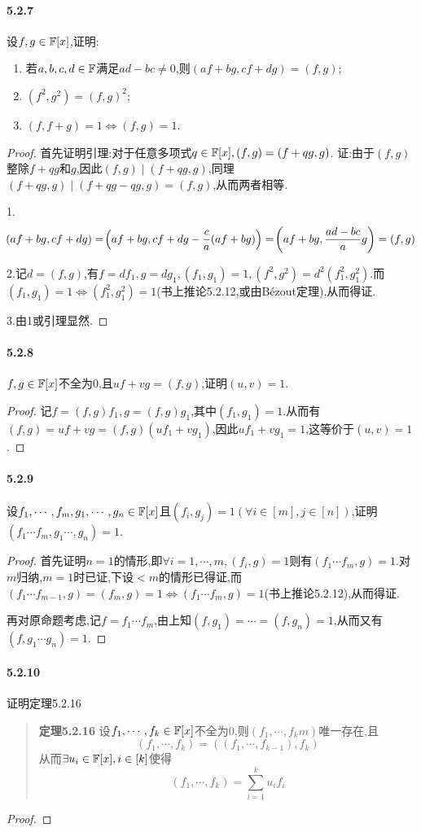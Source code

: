 \documentclass[11pt]{article}
\begin{document}
\paragraph{5.2.7}设$f,g\in\mathbb{F}[x]$,证明:
\begin{enumerate}
    \item 若$a,b,c,d\in \mathbb{F}$满足$ad-bc\neq 0$,则$(af+bg,cf+dg)=(f,g)$;
    \item $(f^2,g^2)=(f,g)^2$;
    \item $(f,f+g)=1\iff (f,g)=1$.
\end{enumerate}
\begin{proof}
    首先证明引理:对于任意多项式$q\in \mathbb{F}[x], (f,g)=(f+qg,g)$. 证:由于$(f,g)$整除$f+qg$和$g$,因此$(f,g)\mid (f+qg,g)$,同理$(f+qg,g)\mid (f+qg-qg,g)=(f,g)$,从而两者相等.

    1. 
    $$\!\left(af+bg,cf+dg\right)=\!\left(af+bg,cf+dg-\frac{c}{a}(af+bg)\right)=\!\left(af+bg,\frac{ad-bc}{a}g\right)=(f,g)$$

    2.记$d=(f,g)$,有$f=df_1, g=dg_1, (f_1,g_1)=1, (f^2,g^2)=d^2(f_1^2,g_1^2)$.而$(f_1,g_1)=1\iff (f_1^2,g_1^2)=1$(书上推论5.2.12,或由Bézout定理),从而得证.

    3.由1或引理显然.
\end{proof}
\paragraph{5.2.8}$f,g\in \mathbb{F}[x]$不全为0,且$uf+vg=(f,g)$,证明$(u,v)=1$.
\begin{proof}
    记$f=(f,g)f_1, g=(f,g)g_1$,其中$(f_1,g_1)=1$.从而有$(f,g)=uf+vg=(f,g)(uf_1+vg_1)$,因此$uf_1+vg_1=1$,这等价于$(u,v)=1$.
\end{proof}
\paragraph{5.2.9}设$f_1,\cdots,f_m,g_1,\cdots,g_n\in \mathbb{F}[x]$且$(f_i,g_j)=1 (\forall i\in [m], j\in [n])$,证明$(f_1\cdots f_m, g_1\cdots, g_n)=1$.
\begin{proof}
    首先证明$n=1$的情形,即$\forall i=1,\cdots,m, (f_i,g)=1$则有$(f_1\cdots f_m,g)=1$.对$m$归纳,$m=1$时已证,下设$<m$的情形已得证,而$(f_1\cdots f_{m-1},g)=(f_m,g)=1\iff (f_1\cdots f_m,g)=1$(书上推论5.2.12),从而得证.

    再对原命题考虑,记$f=f_1\cdots f_m$,由上知$(f,g_1)=\cdots=(f,g_n)=1$,从而又有$(f,g_1\cdots g_n)=1$.
\end{proof}
\paragraph{5.2.10}证明定理5.2.16
\begin{quotation}
    \textbf{定理5.2.16} 设$f_1,\cdots,f_k\in \mathbb{F}[x]$不全为0,则$(f_1,\cdots,f_km)$唯一存在,且
    $$(f_1,\cdots,f_k)=((f_1,\cdots,f_{k-1}),f_k)$$
    从而$\exists u_i\in \mathbb{F}[x], i\in [k]$使得
    $$(f_1,\cdots,f_k)=\sum_{i=1}^k u_i f_i$$
\end{quotation}
\begin{proof}
    
\end{proof}
\end{document}
